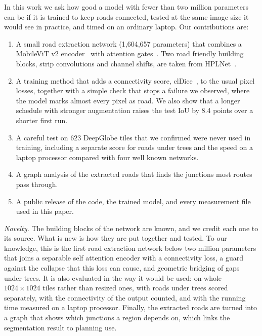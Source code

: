 \documentclass{ieeeaccess}
\begin{document}
In this work we ask how good a model with fewer than two million parameters can be if it is trained to keep roads connected, tested at the same image size it would see in practice, and timed on an ordinary laptop. Our contributions are:

\begin{enumerate}

\item A small road extraction network (1,604,657 parameters) that combines a MobileViT v2 encoder~\cite{mehta2023separable} with attention gates~\cite{oktay2018attention}. Two road friendly building blocks, strip convolutions and channel shifts, are taken from HPLNet~\cite{cui2025hplnet}.

\item A training method that adds a connectivity score, clDice~\cite{shit2021cldice}, to the usual pixel losses, together with a simple check that stops a failure we observed, where the model marks almost every pixel as road. We also show that a longer schedule with stronger augmentation raises the test IoU by 8.4 points over a shorter first run.

\item A careful test on 623 DeepGlobe tiles that we confirmed were never used in training, including a separate score for roads under trees and the speed on a laptop processor compared with four well known networks.

\item A graph analysis of the extracted roads that finds the junctions most routes pass through.

\item A public release of the code, the trained model, and every measurement file used in this paper.

\end{enumerate}

\emph{Novelty.} The building blocks of the network are known, and we credit each one to its source. What is new is how they are put together and tested. To our knowledge, this is the first road extraction network below two million parameters that joins a separable self attention encoder with a connectivity loss, a guard against the collapse that this loss can cause, and geometric bridging of gaps under trees. It is also evaluated in the way it would be used: on whole $1024 \times 1024$ tiles rather than resized ones, with roads under trees scored separately, with the connectivity of the output counted, and with the running time measured on a laptop processor. Finally, the extracted roads are turned into a graph that shows which junctions a region depends on, which links the segmentation result to planning use.
\end{document}
